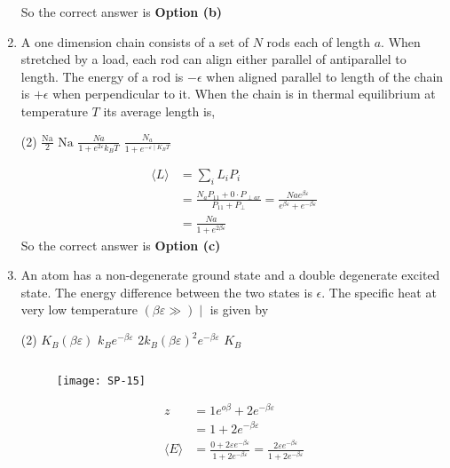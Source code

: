 \begin{enumerate}
\begin{answer}
	So the correct answer is \textbf{Option (b)}
\end{answer}
\item A one dimension chain consists of a set of $N$ rods each of length $a$. When stretched by a load, each rod can align either parallel of antiparallel to length. The energy of a rod is $-\epsilon$ when aligned parallel to length of the chain is $+\epsilon$ when perpendicular to it. When the chain is in thermal equilibrium at temperature $T$ its average length is,
 \begin{tasks}(2)
	\task[\textbf{a.}]$\frac{\mathrm{Na}}{2}$
	\task[\textbf{b.}]$\mathrm{Na}$
	\task[\textbf{c.}]$\frac{N a}{1+e^{2 \varepsilon} k_{B} T}$
	\task[\textbf{d.}] $\frac{N_{a}}{1+e^{-\varepsilon \mid K_{B} T}}$
\end{tasks}
 \begin{answer}
 	\begin{align*}
 	\langle L\rangle&=\sum_{i} L_{i} P_{i}\\
 	&=\frac{N_{a} P_{11}+0 \cdot P_{\perp a r}}{P_{11}+P_{\perp}}=\frac{N a e^{\beta \varepsilon}}{e^{\beta \varepsilon}+e^{-\beta \varepsilon}}\\
 	&=\frac{N a}{1+e^{2 \beta \varepsilon}}
 	\end{align*}
 	So the correct answer is \textbf{Option (c)}
 \end{answer}
\item An atom has a non-degenerate ground state and a double degenerate excited state. The energy difference between the two states is $\epsilon$. The specific heat at very low temperature $(\beta \varepsilon \gg) \mid$ is given by
 \begin{tasks}(2)
	\task[\textbf{a.}]$K_{B}(\beta \varepsilon)$
	\task[\textbf{b.}]$k_{B} e^{-\beta \varepsilon}$
	\task[\textbf{c.}]$2 k_{B}(\beta \varepsilon)^{2} e^{-\beta \varepsilon}$
	\task[\textbf{d.}] $K_{B}$
\end{tasks}
\begin{answer}$\left. \right. $\\
	\begin{figure}[H]
		\centering
		\texttt{[image: SP-15]}
	\end{figure}
	\begin{align*}
	z &=1 e^{o \beta}+2 e^{-\beta \varepsilon} \\
	&=1+2 e^{-\beta \varepsilon}\\
	\langle E\rangle&=\frac{0+2 \varepsilon e^{-\beta \varepsilon}}{1+2 e^{-\beta \varepsilon}}=\frac{2 \varepsilon e^{-\beta \varepsilon}}{1+2 e^{-\beta \varepsilon}}\\

\end{align*}
\end{answer}
\end{enumerate}

